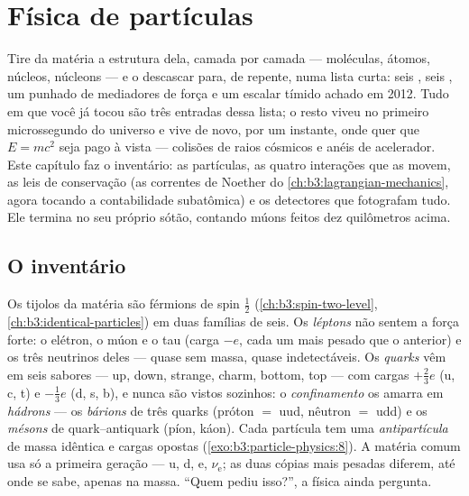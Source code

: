\chapter{Física de partículas}\label{ch:b3:particle-physics}


Tire da matéria a estrutura dela, camada por camada --- moléculas,
átomos, núcleos, núcleons --- e o descascar para, de repente, numa lista
curta: seis \emph{}, seis \emph{}, um punhado de
mediadores de força e um escalar tímido achado em 2012. Tudo em que você
já tocou são três entradas dessa lista; o resto viveu no primeiro
microssegundo do universo e vive de novo, por um instante, onde quer que
$E = mc^2$ seja pago à vista --- colisões de raios cósmicos e anéis de
acelerador. Este capítulo faz o inventário: as partículas, as quatro
interações que as movem, as leis de conservação (as correntes de Noether
do \cref{ch:b3:lagrangian-mechanics}, agora tocando a contabilidade
subatômica) e os detectores que fotografam tudo. Ele
termina no seu próprio sótão, contando múons feitos dez quilômetros acima.

\section{O inventário}

\begin{definition}\label{def:b3:particle-physics:zoo}
Os tijolos da matéria são férmions de spin $\tfrac12$
(\cref{ch:b3:spin-two-level}, \cref{ch:b3:identical-particles}) em
duas famílias de seis. Os \emph{léptons} não sentem a força forte: o
elétron, o múon e o tau (carga $-e$, cada um mais pesado que o anterior)
e os três neutrinos deles --- quase sem massa, quase
indetectáveis. Os \emph{quarks} vêm em seis sabores --- up, down,
strange, charm, bottom, top --- com cargas $+\tfrac23e$ (u, c,
t) e $-\tfrac13e$ (d, s, b), e nunca são vistos sozinhos:
o \emph{confinamento} os amarra em \emph{hádrons} --- os
\emph{bárions} de três quarks (próton $=$ uud, nêutron $=$ udd) e os
\emph{mésons} de quark--antiquark (píon, káon). Cada partícula tem uma
\emph{antipartícula} de massa idêntica e cargas opostas
(\cref{exo:b3:particle-physics:8}). A matéria comum usa só a
primeira geração --- u, d, e, $\nu_{\text{e}}$; as duas cópias mais
pesadas diferem, até onde se sabe, apenas na massa. ``Quem
pediu isso?'', a física ainda pergunta.
\end{definition}

